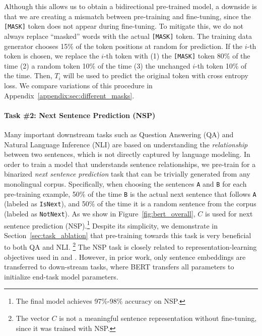 Although this allows us to obtain a bidirectional pre-trained model, a downside is that we are creating a mismatch between pre-training and fine-tuning, since the {\tt [MASK]} token does not appear during fine-tuning. To mitigate this, we do not always replace ``masked'' words with the actual {\tt [MASK]} token. The training data generator chooses 15\% of the token positions at random for prediction. If the $i$-th token is chosen, we replace the $i$-th token with (1) the {\tt [MASK]} token 80\% of the time (2) a random token 10\% of the time (3) the unchanged $i$-th token 10\% of the time. Then, $T_i$ will be used to predict the original token with cross entropy loss.
We compare variations of this procedure in Appendix~\ref{appendix:sec:different_masks}.
\vspace{.2cm}

\paragraph{Task \#2: Next Sentence Prediction (NSP)}
Many important downstream tasks such as Question Answering (QA) and Natural Language Inference (NLI) are based on understanding the {\it relationship} between two sentences, which is not directly captured by language modeling. In order to train a model that understands sentence relationships, we pre-train for a binarized {\it next sentence prediction} task that can be trivially generated from any monolingual corpus. Specifically, when choosing the sentences {\tt A} and {\tt B} for each pre-training example, 50\% of the time {\tt B} is the actual next sentence that follows {\tt A} (labeled
 as {\tt {\small IsNext}}), and 50\% of the time it is a random sentence from the corpus
 (labeled as {\tt {\small NotNext}}). 
As we show in Figure~\ref{fig:bert_overall}, $C$ is used for  next sentence prediction (NSP).\footnote{The final model achieves 97\%-98\% accuracy on NSP.} Despite its simplicity, we demonstrate in Section~\ref{sec:task_ablation} that pre-training towards this task is very beneficial to both QA and NLI.
\footnote{The vector $C$ is not a meaningful sentence representation without fine-tuning, since it was trained with NSP.}
The NSP task is closely related to representation-learning objectives used in \citet{DBLP:journals/corr/JerniteBS17} and \citet{logeswaran2018an}. However, in prior work, only sentence embeddings are transferred to down-stream tasks, where BERT transfers all parameters to initialize end-task model parameters.



